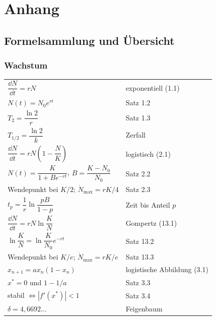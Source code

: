 \appendix
\part{Anhang}

\newcommand{\lit}[3]{\vspace{5pt}\noindent\textbf{[#1]} #2\par\nopagebreak\vspace{1pt}{\small\itshape\color{grau} #3}\par\vspace{2pt}}

\chapter{Formelsammlung und Übersicht}

\section{Wachstum}

\begin{merksatz}
\begin{center}
{\small
\renewcommand{\arraystretch}{1.62}
\begin{tabular}{@{}P{4.4cm}P{4.2cm}@{}}
\toprule
$\dfrac{\dd N}{\dd t} = rN$ & exponentiell (1.1)\\
$N(t) = N_0e^{rt}$ & Satz 1.2\\
$T_2 = \dfrac{\ln 2}{r}$ & Satz 1.3\\
$T_{1/2} = \dfrac{\ln 2}{k}$ & Zerfall\\
$\dfrac{\dd N}{\dd t} = rN\left(1-\dfrac{N}{K}\right)$ & logistisch (2.1)\\
$N(t) = \dfrac{K}{1+Be^{-rt}}$, $B = \dfrac{K-N_0}{N_0}$ & Satz 2.2\\
Wendepunkt bei $K/2$; $\dot N_{\max} = rK/4$ & Satz 2.3\\
$t_p = \dfrac{1}{r}\ln\dfrac{pB}{1-p}$ & Zeit bis Anteil $p$\\
$\dfrac{\dd N}{\dd t} = rN\ln\dfrac{K}{N}$ & Gompertz (13.1)\\
$\ln\dfrac{K}{N} = \ln\dfrac{K}{N_0}e^{-rt}$ & Satz 13.2\\
Wendepunkt bei $K/e$; $\dot N_{\max} = rK/e$ & Satz 13.3\\
$x_{n+1} = ax_n(1-x_n)$ & logistische Abbildung (3.1)\\
$x^{*} = 0$ und $1-1/a$ & Satz 3.3\\
stabil $\iff |f'(x^{*})|<1$ & Satz 3.4\\
$\delta = 4{,}6692\ldots$ & Feigenbaum\\
\bottomrule
\end{tabular}}
\end{center}
\end{merksatz}

